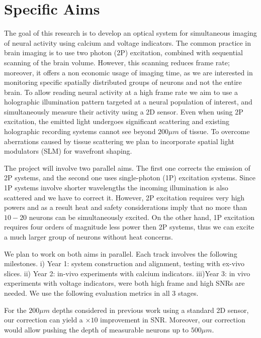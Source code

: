 \section*{Specific Aims}

The goal of this research is to develop an optical system for simultaneous imaging of neural activity using calcium and voltage indicators. 
The common practice in brain imaging is to use two photon (2P) excitation,  combined with sequential scanning of the brain volume. However, this scanning reduces frame rate; moreover, it offers  a non economic usage of imaging time, as we are  interested in monitoring specific spatially distributed groups of neurons and not the entire brain.
To allow reading neural activity at a high frame rate we aim to
use a holographic illumination pattern targeted at a neural population of interest, and simultaneously measure their activity using a 2D sensor. 
Even when using 2P excitation, the emitted light  undergoes significant scattering and existing  holographic recording systems cannot see beyond $200\mu m$ of tissue.
 To overcome aberrations caused by tissue scattering we plan to incorporate spatial light modulators (SLM) for wavefront shaping. 

The project will involve two parallel aims. The first one corrects the emission of 2P systems, and the second one uses single-photon (1P) excitation systems. Since 1P systems involve shorter wavelengths the incoming illumination is also scattered  and we  have to correct it. However, 2P excitation requires very high powers and as a result heat and safety considerations imply that no more than $10-20$ neurons can be simultaneously excited. 
On the other hand, 1P excitation requires four orders of magnitude less power then 2P systems, thus we can excite a much larger group of neurons without heat concerns.
	
We plan to work on both aims in parallel. Each track involves the following milestones. i) Year 1: system construction and alignment,  testing with ex-vivo   slices. ii) Year 2: in-vivo experiments with calcium indicators. iii)Year 3: in vivo experiments with voltage indicators, were both high frame and high SNRs are needed. We use the following evaluation metrics in all 3 stages.


	
For the $200\mu m$ depths considered in previous work using a standard 2D sensor, our correction can yield a $\times 10$ improvement in SNR. Moreover, our correction would allow pushing the depth of measurable neurons up to $500\mu m$.
	
